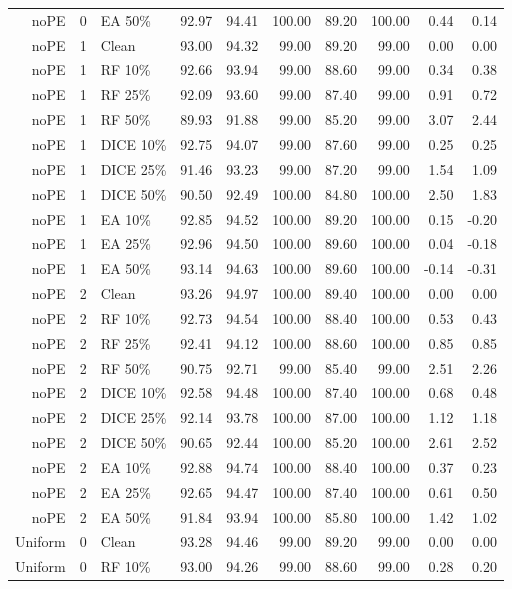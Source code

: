 {\begin{longtable}{rllrrrrrrr}
noPE & 0 & EA 50\% & 92.97 & 94.41 & 100.00 & 89.20 & 100.00 & 0.44 & 0.14 \\
noPE & 1 & Clean & 93.00 & 94.32 & 99.00 & 89.20 & 99.00 & 0.00 & 0.00 \\
noPE & 1 & RF 10\% & 92.66 & 93.94 & 99.00 & 88.60 & 99.00 & 0.34 & 0.38 \\
noPE & 1 & RF 25\% & 92.09 & 93.60 & 99.00 & 87.40 & 99.00 & 0.91 & 0.72 \\
noPE & 1 & RF 50\% & 89.93 & 91.88 & 99.00 & 85.20 & 99.00 & 3.07 & 2.44 \\
noPE & 1 & DICE 10\% & 92.75 & 94.07 & 99.00 & 87.60 & 99.00 & 0.25 & 0.25 \\
noPE & 1 & DICE 25\% & 91.46 & 93.23 & 99.00 & 87.20 & 99.00 & 1.54 & 1.09 \\
noPE & 1 & DICE 50\% & 90.50 & 92.49 & 100.00 & 84.80 & 100.00 & 2.50 & 1.83 \\
noPE & 1 & EA 10\% & 92.85 & 94.52 & 100.00 & 89.20 & 100.00 & 0.15 & -0.20 \\
noPE & 1 & EA 25\% & 92.96 & 94.50 & 100.00 & 89.60 & 100.00 & 0.04 & -0.18 \\
noPE & 1 & EA 50\% & 93.14 & 94.63 & 100.00 & 89.60 & 100.00 & -0.14 & -0.31 \\
noPE & 2 & Clean & 93.26 & 94.97 & 100.00 & 89.40 & 100.00 & 0.00 & 0.00 \\
noPE & 2 & RF 10\% & 92.73 & 94.54 & 100.00 & 88.40 & 100.00 & 0.53 & 0.43 \\
noPE & 2 & RF 25\% & 92.41 & 94.12 & 100.00 & 88.60 & 100.00 & 0.85 & 0.85 \\
noPE & 2 & RF 50\% & 90.75 & 92.71 & 99.00 & 85.40 & 99.00 & 2.51 & 2.26 \\
noPE & 2 & DICE 10\% & 92.58 & 94.48 & 100.00 & 87.40 & 100.00 & 0.68 & 0.48 \\
noPE & 2 & DICE 25\% & 92.14 & 93.78 & 100.00 & 87.00 & 100.00 & 1.12 & 1.18 \\
noPE & 2 & DICE 50\% & 90.65 & 92.44 & 100.00 & 85.20 & 100.00 & 2.61 & 2.52 \\
noPE & 2 & EA 10\% & 92.88 & 94.74 & 100.00 & 88.40 & 100.00 & 0.37 & 0.23 \\
noPE & 2 & EA 25\% & 92.65 & 94.47 & 100.00 & 87.40 & 100.00 & 0.61 & 0.50 \\
noPE & 2 & EA 50\% & 91.84 & 93.94 & 100.00 & 85.80 & 100.00 & 1.42 & 1.02 \\
Uniform & 0 & Clean & 93.28 & 94.46 & 99.00 & 89.20 & 99.00 & 0.00 & 0.00 \\
Uniform & 0 & RF 10\% & 93.00 & 94.26 & 99.00 & 88.60 & 99.00 & 0.28 & 0.20 \\

\end{longtable}}
